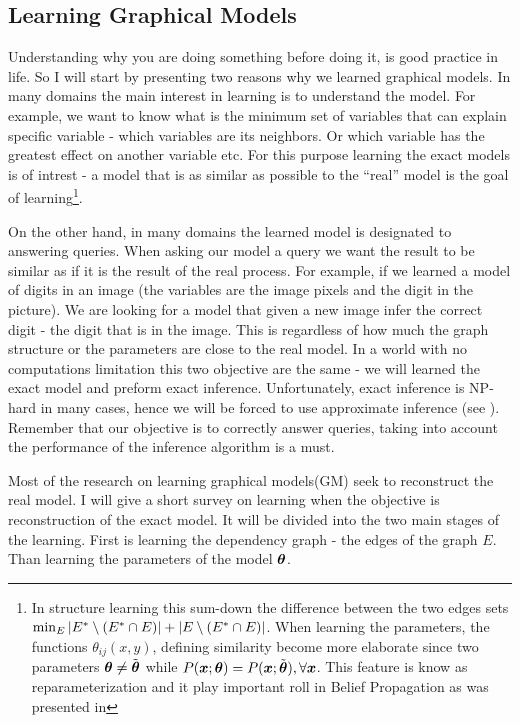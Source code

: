 \subsection{Learning Graphical Models}
\label{sec:learning}
Understanding why you are doing something before doing it, is good practice in life. 
So I will start by presenting two reasons why we learned graphical models.
In many domains the main interest in learning is to understand the model.
For example, we want to know what is the minimum set of variables that can explain specific variable - which variables are its neighbors.
Or which variable has the greatest effect on another variable etc.
For this purpose learning the exact models is of intrest - a model that is as similar as possible to the ``real'' model is the goal of learning\footnote{
In structure learning this sum-down the difference between the two edges sets $ \min_{E} |{E}^{*}\setminus ({E}^{*} \cap E)| + |E \setminus ({E}^{*} \cap E)|$.
When learning the parameters, the functions $\theta_{ij}(x,y)$, defining similarity become more elaborate since two parameters $\boldsymbol{\theta} \neq \tilde{\boldsymbol{\theta}}$ while $P(\boldsymbol{x}; \boldsymbol{\theta}) = P(\boldsymbol{x}; \tilde{\boldsymbol{\theta}}), \forall \boldsymbol{x}$.
This feature is know as reparameterization and it play important roll in Belief Propagation as was presented in }.

On the other hand, in many domains the learned model is designated to answering queries.
When asking our model a query we want the result to be similar as if it is the result of the real process.
For example, if we learned a model of digits in an image (the variables are the image pixels and the digit in the picture).
We are looking for a model that given a new image infer the correct digit - the digit that is in the image.
This is regardless of how much the graph structure or the parameters are close to the real model.
In a world with no computations limitation this two objective are the same - we will learned the exact model and preform exact inference.
Unfortunately, exact inference is NP-hard in many cases, hence we will be forced to use approximate inference (see ).
Remember that our objective is to correctly answer queries, taking into account the performance of the inference algorithm is a must.

Most of the research on learning graphical models(GM) seek to reconstruct the real model.
I will give a short survey on learning when the objective is reconstruction of the exact model.
It will be divided into the two main stages of the learning.
First is learning the dependency graph - the edges of the graph $E$.
Than learning the parameters of the model $\boldsymbol{\theta}$.
